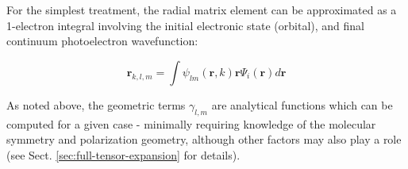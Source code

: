 \documentclass[10pt]{article}
\begin{document}


For the simplest treatment, the radial matrix element can be approximated as a 1-electron integral involving the initial electronic state (orbital), and final continuum photoelectron wavefunction:


\begin{equation}
\mathbf{r}_{k,l,m}=\int\psi_{lm}(\mathbf{r},k)\mathbf{r}\Psi_{i}(\mathbf{r})d\mathbf{r}
\label{eq:r-kllam-integral}
\end{equation}

As noted above, the geometric terms $\gamma_{l,m}$ are analytical functions which can be computed for a given case - minimally requiring knowledge of the molecular symmetry and polarization geometry, although other factors may also play a role (see Sect. \ref{sec:full-tensor-expansion} for details). 



\end{document}
